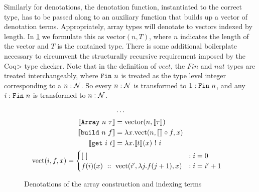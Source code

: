   Similarly for denotations, the denotation function, instantiated to the correct type, has to be passed along to an auxiliary function that builds up a vector of denotation terms.
  Appropriately, array types will denotate to vectors indexed by length.
  In \cref{fig:denotation_array} we formulate this as $\text{vector}(n, T)$, where $n$ indicates the length of the vector and $T$ is the contained type.
  There is some additional boilerplate necessary to circumvent the structurally recursive requirement imposed by the \<Coq> type checker.
  Note that in the definition of $vect$, the $Fin$ and $nat$ types are treated interchangeably, where $\texttt{Fin}\ n$ is treated as the type level integer corresponding to a $n : \mathcal{N}$.
  So every $n : \mathcal{N}$ is transformed to $1 : \texttt{Fin}\ n$, and any $i : \texttt{Fin}\ n$ is transformed to $n : \mathcal{N}$.

  \begin{figure}
    \begin{gather*}
      \begin{aligned}
        &\cdots \\
        \llbracket \texttt{Array}\ n\ \tau \rrbracket &=
          \text{vector}(n, \llbracket \tau \rrbracket) \\
        \llbracket \texttt{build}\ n\ f \rrbracket &=
          \lambda x.
          \text{vect}(n, \llbracket \rrbracket \circ f, x) \\
        \llbracket \texttt{get}\ i\ t \rrbracket &=
          \lambda x. \llbracket t \rrbracket(x)\ !\ i \\
      \end{aligned} \\
      \begin{aligned}
      \text{vect}(i, f, x) &=
        \begin{cases}
          [\ ]
            &: i = 0 \\
          f(i)(x)\ ::\ \text{vect}(i', \lambda j. f(j + 1), x)
            &: i = i' + 1
        \end{cases}
      \end{aligned}
    \end{gather*}
    \caption{Denotations of the array construction and indexing terms}
    \label{fig:denotation_array}
  \end{figure}

